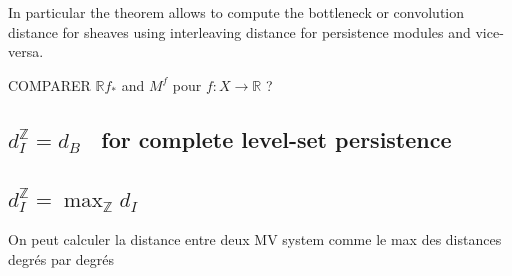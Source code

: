 \documentclass[a4paper, english, 11pt]{article}
\newcommand{\0}{\vec{0}}
\newcommand{\R}[0]{\mathbb{R}}
\newcommand{\Z}[0]{\mathbb{Z}}
\begin{document}
In particular the theorem allows to compute the bottleneck or convolution distance for sheaves using interleaving distance for persistence modules and vice-versa.

COMPARER $\mathbb{R}f_*$ and $M^f$ pour $f:X\to \R$ ?

\subsection{\og $d_I^\Z = d_B$ \fg ~for complete level-set persistence}

\subsection{\og $d_I^\Z = \max_\Z d_I$\fg~}
On peut calculer la distance entre deux MV system comme le max des distances degrés par degrés







\end{document}
